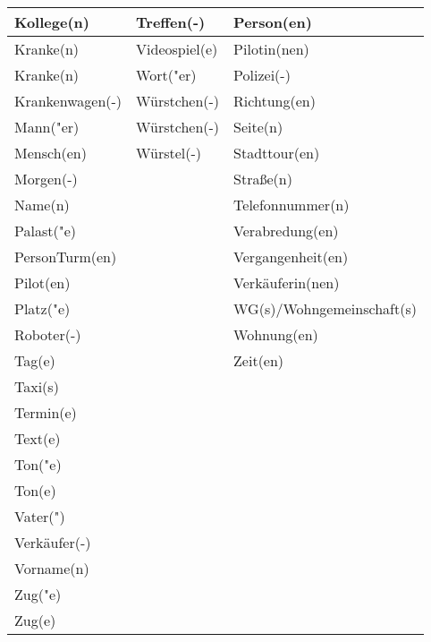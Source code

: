 \documentclass{article}
\begin{document}
\begin{table}[h!]
\begin{tabular}{|>{\raggedright\arraybackslash}p{5cm}|>{\raggedright\arraybackslash}p{5cm}|>{\raggedright\arraybackslash}p{5cm}|}
        Kollege(n) & Treffen(-) & Person(en) \\\hline
        Kranke(n) & Videospiel(e) & Pilotin(nen) \\\hline
        Kranke(n) & Wort("er) & Polizei(-) \\\hline
        Krankenwagen(-) & Würstchen(-) & Richtung(en) \\\hline
        Mann("er) & Würstchen(-) & Seite(n) \\\hline
        Mensch(en) & Würstel(-) & Stadttour(en) \\\hline
        Morgen(-) &  & Stra\ss{}e(n) \\\hline
        Name(n) &  & Telefonnummer(n) \\\hline
        Palast("e) &  & Verabredung(en) \\\hline
        PersonTurm(en) &  & Vergangenheit(en) \\\hline
        Pilot(en) &  & Verkäuferin(nen) \\\hline
        Platz("e) &  & WG(s)/Wohngemeinschaft(s) \\\hline
        Roboter(-) &  & Wohnung(en) \\\hline
        Tag(e) &  & Zeit(en) \\\hline
        Taxi(s) &  &  \\\hline
        Termin(e) &  &  \\\hline
        Text(e) &  &  \\\hline
        Ton("e) &  &  \\\hline
        Ton(e) &  &  \\\hline
        Vater(") &  &  \\\hline
        Verkäufer(-) &  &  \\\hline
        Vorname(n) &  &  \\\hline
        Zug("e) &  &  \\\hline
        Zug(e) &  &  \\\hline
    \end{tabular}
\end{table}
\end{document}
